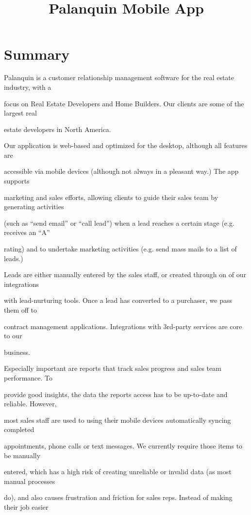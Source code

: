 \documentclass[11pt,a4paper]{article}
\begin{document}
\title{Palanquin Mobile App}
\maketitle

\section{Summary}

Palanquin is a customer relationship management software for the real estate industry, with a

focus on Real Estate Developers and Home Builders. Our clients are some of the largest real

estate developers in North America.

Our application is web-based and optimized for the desktop, although all features are

accessible via mobile devices (although not always in a pleasant way.) The app supports

marketing and sales efforts, allowing clients to guide their sales team by generating activities

(such as “send email” or “call lead”) when a lead reaches a certain stage (e.g. receives an “A”

rating) and to undertake marketing activities (e.g. send mass mails to a list of leads.)

Leads are either manually entered by the sales staff, or created through on of our integrations

with lead-nurturing tools. Once a lead has converted to a purchaser, we pass them off to

contract management applications. Integrations with 3rd-party services are core to our

business.

Especially important are reports that track sales progress and sales team performance. To

provide good insights, the data the reports access has to be up-to-date and reliable. However,

most sales staff are used to using their mobile devices automatically syncing completed

appointments, phone calls or text messages. We currently require those items to be manually

entered, which has a high risk of creating unreliable or invalid data (as most manual processes

do), and also causes frustration and friction for sales reps. Instead of making their job easier
\end{document}
